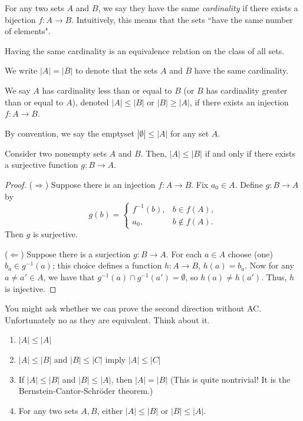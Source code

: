 For any two sets $A$ and $B$, we say they have the same \emph{cardinality} if there exists a bijection \(f\colon A\to B\). Intuitively, this means that the sets ``have the same number of elements".  

Having the same cardinality is an equivalence relation on the class of all sets.  

We write \(|A| = |B|\) to denote that the sets \(A\) and \(B\) have the same cardinality.

We say $A$ has cardinality less than or equal to $B$ (or $B$ has cardinality greater than or equal to $A$), denoted \(|A|\le |B|\) or $|B|\ge |A|$, if there exists an injection \(f\colon A\to B\).  

\begin{remark}
  By convention, we say the emptyset $|\emptyset|\leq |A|$ for any set $A$. 
\end{remark}

\begin{lemma}
Consider two nonempty sets $A$ and $B$. Then, $|A|\leq |B|$ if and only if there exists a surjective function \(g\colon B\to A\).
\end{lemma}
\begin{proof}
($\Rightarrow$) Suppose there is an injection $f:A\to B$. Fix $a_0\in A$. Define $g:B\to A$ by
\[
g(b)=
\begin{cases}
f^{-1}(b), & b\in f(A),\\
a_0, & b\notin f(A).
\end{cases}
\]
Then $g$ is surjective.

($\Leftarrow$) Suppose there is a surjection $g:B\to A$. For each $a\in A$ choose (one) $b_a\in g^{-1}(a)$; this choice defines a function $h:A\to B$, $h(a)=b_a$. Now for any $a\neq a'\in A$, we have that $g^{-1}(a)\cap g^{-1}(a')=\emptyset$, so $h(a)\neq h(a')$. Thus, $h$ is injective.
\end{proof}

You might ask whether we can prove the second direction without AC. Unfortunately no as they are equivalent. Think about it.

\begin{theorem}
  \begin{enumerate}
    \item $|A|\leq |A|$
    \item $|A|\leq |B|$ and $|B|\leq |C|$ imply $|A|\leq |C|$
    \item If $|A|\leq |B|$ and $|B|\leq |A|$, then $|A|=|B|$ (This is quite nontrivial! It is the Bernstein-Cantor-Schröder theorem.)
    \item For any two sets $A,B$, either \(|A|\le |B|\) or \(|B|\le |A|\).
  \end{enumerate}
\end{theorem}

